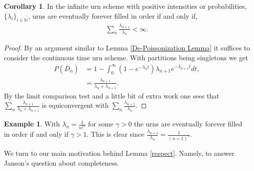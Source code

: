 \documentclass[12pt]{article}
\theoremstyle{definition}
\newtheorem{corollary}[proposition]{Corollary}
\newtheorem{example}[proposition]{Example}
\begin{document}
\begin{corollary} In the infinite urn scheme with positive intensities or probabilities, $\{\lambda_i\}_{i \in \mathbb{N}}$, urns are eventually forever filled in order if and only if,
\begin{align*}
    \sum_n \frac{\lambda_{n+1}}{\lambda_n} < \infty.
\end{align*}
\end{corollary}
\begin{proof} By an argument similar to Lemma \ref{De-Poissonization Lemma} it suffices to consider the continuous time urn scheme. With partitions being singletons we get
    \begin{align*}
        P(\overline{D}_n) &= 1-\int_0^\infty (1-e^{-\lambda_n t})\lambda_{n+1}e^{-\lambda_{n+1}t}dt, \\
        &=\frac{\lambda_{n+1}}{\lambda_n+ \lambda_{n+1}}.
    \end{align*}
By the limit comparison test and a little bit of extra work one sees that $\sum_n  \frac{\lambda_{n+1}}{\lambda_n+\lambda_{n+1}}$  is equiconvergent with $\sum_n \frac{\lambda_{n+1}}{\lambda_n}$. 
\end{proof}
\begin{example}
    With $\lambda_n = \frac{1}{n!^\gamma}$ for some $\gamma > 0$ the urns are eventually forever filled in order if and only if $\gamma > 1$. This is clear since $\frac{\lambda_{n+1}}{\lambda_n} = \frac{1}{(n+1)^\gamma}$.
\end{example}

We turn to our main motivation behind Lemma \ref{respect}. Namely, to answer Janson's question about completeness.
\end{document}
